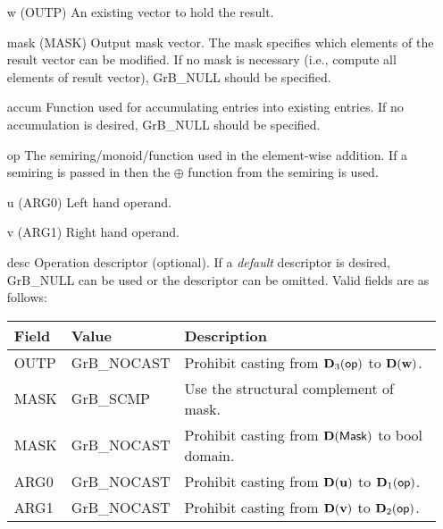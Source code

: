 \begin{itemize}[leftmargin=1.1in]
    \item[{\sf w}]     ({\sf OUTP}) An existing vector to hold the result.

    \item[{\sf mask}] ({\sf MASK}) Output mask vector. The mask
    specifies which elements of the result vector can be modified.
    If no mask is necessary (i.e., compute all elements of result
    vector), {\sf GrB\_NULL} should be specified.

    \item[{\sf accum}]  Function used for accumulating entries into existing
                         entries. If no accumulation is desired,
                        {\sf GrB\_NULL} should be specified.

    \item[{\sf op}]    The semiring/monoid/function used in the element-wise addition.
                       If a semiring is passed in then the $\oplus$  function from
                                    the semiring is used.
    \item[{\sf u}]     ({\sf ARG0}) Left hand operand.
    \item[{\sf v}]     ({\sf ARG1}) Right hand operand.

    \item[{\sf desc}]  Operation descriptor (optional). If a
    \emph{default} descriptor is desired, {\sf GrB\_NULL} can be
    used or the descriptor can be omitted. Valid fields are as follows: \\
    \begin{tabular}{lll}
    Field  & Value & Description \\
    \hline
    {\sf OUTP} & {\sf GrB\_NOCAST} & Prohibit casting from $\bold{D}_3({\sf op})$ to $\bold{D}({\bf w})$. \\
    {\sf MASK} & {\sf GrB\_SCMP} & Use the structural complement of {\sf mask}. \\
    {\sf MASK} & {\sf GrB\_NOCAST} & Prohibit casting from $\bold{D}({\sf Mask})$ to {\sf bool} domain. \\
    {\sf ARG0} & {\sf GrB\_NOCAST} & Prohibit casting from $\bold{D}({\bf u})$ to $\bold{D}_1({\sf op})$. \\
    {\sf ARG1} & {\sf GrB\_NOCAST} & Prohibit casting from $\bold{D}({\bf v})$ to $\bold{D}_2({\sf op})$. \\
    \end{tabular}
\end{itemize}

